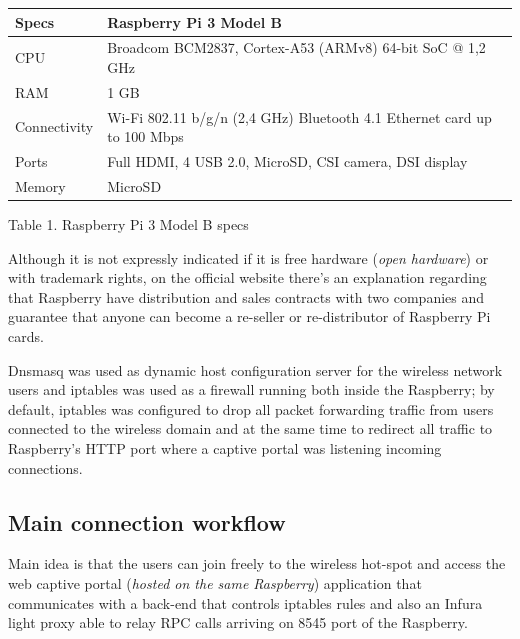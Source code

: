 \documentclass[12pt]{amsart}
\begin{document}
\begin{multicols}{2}
\begin{center}
\vspace{0.35cm}

\begin{tabular}{ | m{} | m{} | }
 \hline
 Specs & Raspberry Pi 3 Model B \\
 \hline
 CPU & Broadcom BCM2837, Cortex-A53 (ARMv8) 64-bit SoC @ 1,2 GHz \\
\hline
 RAM & 1 GB \\
\hline
 Connectivity & Wi-Fi 802.11 b/g/n (2,4 GHz) Bluetooth 4.1 Ethernet card up to 100 Mbps \\
\hline
 Ports & Full HDMI, 4 USB 2.0, MicroSD, CSI camera, DSI display \\
\hline
 Memory & MicroSD \\
\hline
\end{tabular}
\end{center}
\vspace{0.15cm}
Table 1. Raspberry Pi 3 Model B specs

\vspace{0.35cm}

Although it is not expressly indicated if it is free hardware
(\textit{open hardware}) or with trademark rights, on the
official website there's an explanation regarding
that Raspberry have distribution and sales contracts with
two companies and guarantee that anyone can become a re-seller or
re-distributor of Raspberry Pi cards\cite{RaspberryPi19}.

\vspace{0.35cm}

Dnsmasq\cite{dnsmasq} was used
as dynamic host configuration server for the wireless
network users and
iptables\cite{iptables} was used as a firewall running
both inside the Raspberry; by default, iptables
was configured to
drop all packet
forwarding traffic from users connected to the wireless
domain and at the same time to redirect all
traffic to Raspberry's HTTP port where a
captive portal was listening incoming connections.


\subsection{Main connection workflow}

\vspace{0.35cm}

Main idea is that the users can join freely
to the wireless hot-spot and access the web captive portal
(\textit{hosted on the same Raspberry}) application that
communicates with a back-end that controls iptables
rules and also an Infura light proxy able to relay RPC
calls arriving on 8545 port of the Raspberry.


\end{multicols}
\end{document}
